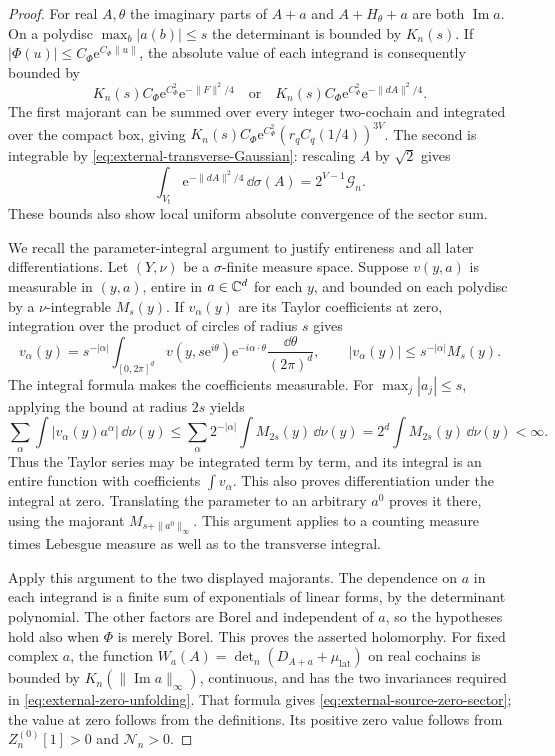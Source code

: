 \begin{proof}
For real $A,\theta$ the imaginary parts of $A+a$ and
$A+H_\theta+a$ are both $\operatorname{Im}a$. On a
polydisc $\max_b|a(b)|\le s$ the determinant is
bounded by $K_n(s)$. If
$|\Phi(u)|\le C_\Phi \mathrm e^{C_\Phi\|u\|}$, the absolute
value of each integrand is consequently bounded by
\[
 K_n(s)C_\Phi \mathrm e^{C_\Phi^2}\mathrm e^{-\|F\|^2/4}
 \quad\text{or}\quad
 K_n(s)C_\Phi \mathrm e^{C_\Phi^2}\mathrm e^{-\|dA\|^2/4}.
\]
The first majorant can be summed over every integer
two-cochain and integrated over the compact box,
giving
$K_n(s)C_\Phi \mathrm e^{C_\Phi^2}(r_qC_q(1/4))^{3V}$.
The second is integrable by
\eqref{eq:external-transverse-Gaussian}: rescaling
$A$ by $\sqrt2$ gives
\[
 \int_{V_{\mathrm t}}\mathrm e^{-\|dA\|^2/4}\,\dd\sigma(A)
                          =2^{V-1}\mathcal G_n.
\]
These bounds also show local uniform absolute
convergence of the sector sum.

We recall the parameter-integral argument to justify
entireness and all later differentiations. Let
$(Y,\nu)$ be a $\sigma$-finite measure space. Suppose
$v(y,a)$ is measurable in $(y,a)$, entire in
$a\in\mathbb C^d$ for each $y$, and bounded on each
polydisc by a $\nu$-integrable $M_s(y)$. If $v_\alpha(y)$
are its Taylor coefficients at zero, integration
over the product of circles of radius $s$ gives
\[
 v_\alpha(y)=s^{-|\alpha|}
       \int_{[0,2\pi]^d}
       v(y,s\mathrm e^{i\theta})\mathrm e^{-i\alpha\cdot\theta}
                         \frac{\dd\theta}{(2\pi)^d},
 \qquad |v_\alpha(y)|\le s^{-|\alpha|}M_s(y).
\]
The integral formula makes the coefficients measurable.
For $\max_j|a_j|\le s$, applying the bound at radius
$2s$ yields
\[
 \sum_\alpha\int|v_\alpha(y)a^\alpha|\,\dd\nu(y)
       \le\sum_\alpha2^{-|\alpha|}\int M_{2s}(y)\,\dd\nu(y)
       =2^d\int M_{2s}(y)\,\dd\nu(y)<\infty.
\]
Thus the Taylor series may be integrated term by term,
and its integral is an entire function with coefficients
$\int v_\alpha$. This also proves differentiation under
the integral at zero. Translating the parameter to an
arbitrary $a^0$ proves it there, using the majorant
$M_{s+\|a^0\|_\infty}$. This argument applies to a
counting measure times Lebesgue measure as well as to
the transverse integral.

Apply this argument to the two displayed majorants.
The dependence on $a$ in each integrand is a finite
sum of exponentials of linear forms, by the determinant
polynomial. The other factors are Borel and independent
of $a$, so the hypotheses hold also when $\Phi$ is
merely Borel. This proves the asserted holomorphy.
For fixed complex $a$, the function
$W_a(A)=\det_n(D_{A+a}+\mu_{\mathrm{lat}})$ on real
cochains is bounded by $K_n(\|\operatorname{Im}a\|_\infty)$,
continuous, and has the two invariances required in
\eqref{eq:external-zero-unfolding}. That formula gives
\eqref{eq:external-source-zero-sector}; the value at zero
follows from the definitions. Its positive zero value
follows from $Z_n^{(0)}[1]>0$ and $\mathcal N_n>0$.
\end{proof}

